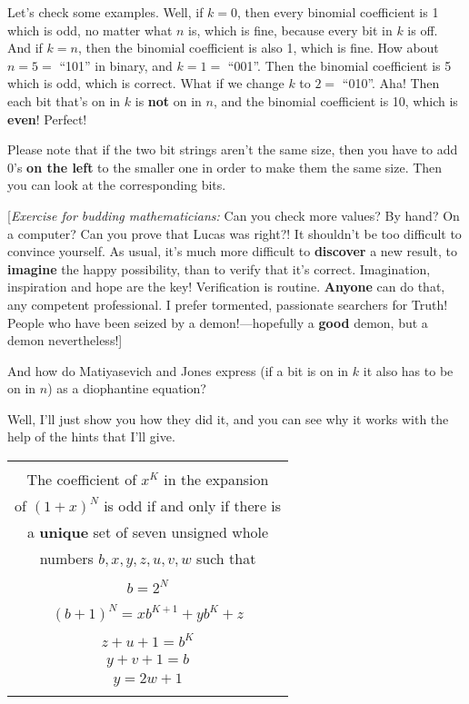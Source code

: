 \documentclass[12pt]{book}
\begin{document}
Let's check some examples. Well, if $k = 0$, then every binomial coefficient is 1 which is odd, no matter what
$n$ is, which is fine, because every bit in $k$ is off.
And if $k = n$, then the binomial coefficient is also 1, which is fine.
How about $n = 5 =$ ``101'' in binary, and $k = 1 =$ ``001''. Then the binomial coefficient is 5 which is odd,
which is correct.   What if we change $k$ to $2 =$ ``010''. Aha! 
Then each bit that's on in $k$ is \textbf{not} on in $n$,
and the binomial coefficient is 10, which is \textbf{even}!
Perfect!
 
Please note that
if the two bit strings aren't the same size, then you have to add 0's \textbf{on the left} to the
smaller one in order to make them the same size.  Then you can look at the corresponding bits.

\medskip
{\footnotesize [\emph{Exercise for budding mathematicians:} Can you check more values? By hand? On a computer?
Can you prove that Lucas was right?!  It shouldn't be too difficult to convince yourself.
As usual, it's much more difficult to \textbf{discover} a new result, 
to \textbf{imagine} the happy possibility,
than to verify that it's correct. Imagination, inspiration and hope are the key!
Verification is routine. \textbf{Anyone} can do that, any competent professional.
I prefer tormented, passionate searchers for Truth!
People who have been seized by a demon!---hopefully a \textbf{good} demon, but a demon nevertheless!]

}
\medskip

And how do Matiyasevich and Jones express (if a bit is on in $k$ it also
has to be on in $n$) as a diophantine equation?
 
Well, I'll just show you how they did it, and you can see why it works
with the help of the hints that I'll give.
 
\begin{center}
\begin{tabular}{|c|}
\hline
\\
The coefficient of $x^K$ in the expansion 
\\
of $(1+x)^N$ is odd if and only if there is 
\\
a \textbf{unique} set of seven unsigned whole 
\\
numbers $b, x, y, z, u, v, w$ such that
\\ \\
$b = 2^N$
\\ \\
$(b+1)^N = x b^{K+1} + y b^K + z$ 
\\ \\
$z + u + 1 = b^K$ 
\\
$y + v + 1 = b$
\\
$y = 2w + 1$
\\
\\
\hline
\end{tabular}
\end{center}
\end{document}
